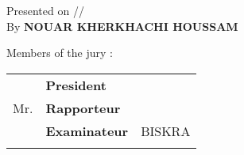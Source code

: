\begin{titlepage}
\begin{center}
\par\end{center}

\begin{center}
Presented on \quad{}/\quad{}/\quad{}\\
By  \textbf{NOUAR KHERKHACHI HOUSSAM}
\par\end{center}

\begin{center}
\vspace*{1.5cm}

\par\end{center}

Members of the jury :\\
 

\begin{minipage}[t]{1\columnwidth}%
\begin{tabular}{lll}
 & \textbf{\small{}President} & \tabularnewline
Mr.  & \textbf{\small{}Rapporteur} & \tabularnewline
 & \textbf{\small{}Examinateur} & {\small{}BISKRA }\tabularnewline
 &  & \tabularnewline
\end{tabular}%
\end{minipage}

\end{titlepage} 

